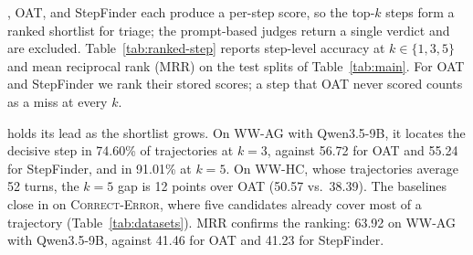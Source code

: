 
\soap{}, OAT, and StepFinder each produce a per-step score, so the top-$k$ steps form a ranked shortlist for triage; the prompt-based judges return a single verdict and are excluded. Table~\ref{tab:ranked-step} reports step-level accuracy at $k \in \{1, 3, 5\}$ and mean reciprocal rank (MRR) on the test splits of Table~\ref{tab:main}. For OAT and StepFinder we rank their stored scores; a step that OAT never scored counts as a miss at every $k$.

\soap{} holds its lead as the shortlist grows. On \textsc{WW-AG} with Qwen3.5-9B, it locates the decisive step in 74.60\% of trajectories at $k{=}3$, against 56.72 for OAT and 55.24 for StepFinder, and in 91.01\% at $k{=}5$. On \textsc{WW-HC}, whose trajectories average 52 turns, the $k{=}5$ gap is 12 points over OAT (50.57 vs.\ 38.39). The baselines close in on \textsc{Correct-Error}, where five candidates already cover most of a trajectory (Table~\ref{tab:datasets}). MRR confirms the ranking: 63.92 on \textsc{WW-AG} with Qwen3.5-9B, against 41.46 for OAT and 41.23 for StepFinder.

